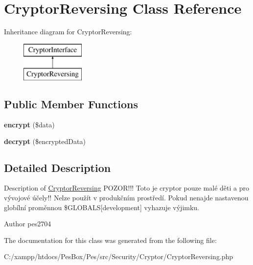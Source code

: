 \hypertarget{class_pes_1_1_security_1_1_cryptor_1_1_cryptor_reversing}{}\section{Cryptor\+Reversing Class Reference}
\label{class_pes_1_1_security_1_1_cryptor_1_1_cryptor_reversing}
Inheritance diagram for Cryptor\+Reversing\+:\begin{figure}[H]
\begin{center}
\leavevmode
\includegraphics[height=2.000000cm]{class_pes_1_1_security_1_1_cryptor_1_1_cryptor_reversing}
\end{center}
\end{figure}
\subsection*{Public Member Functions}
\begin{DoxyCompactItemize}
\item 
\mbox{\label{class_pes_1_1_security_1_1_cryptor_1_1_cryptor_reversing_a07bcc8ef1d23370470ecb5ae8fc07dfa}} 
{\bfseries encrypt} (\$data)
\item 
\mbox{\label{class_pes_1_1_security_1_1_cryptor_1_1_cryptor_reversing_ac5a3db4820ef04ce648cd623192c8d96}} 
{\bfseries decrypt} (\$encrypted\+Data)
\end{DoxyCompactItemize}


\subsection{Detailed Description}
Description of \mbox{\hyperlink{class_pes_1_1_security_1_1_cryptor_1_1_cryptor_reversing}{Cryptor\+Reversing}} P\+O\+Z\+O\+R!!! Toto je cryptor pouze malé děti a pro vývojové účely!! Nelze použít v produkčním prostředí. Pokud nenajde nastavenou globílní proměnnou \$\+G\+L\+O\+B\+A\+LS\mbox{[}\textquotesingle{}development\textquotesingle{}\mbox{]} vyhazuje výjimku.

\begin{DoxyAuthor}{Author}
pes2704 
\end{DoxyAuthor}


The documentation for this class was generated from the following file\+:\begin{DoxyCompactItemize}
\item 
C\+:/xampp/htdocs/\+Pes\+Box/\+Pes/src/\+Security/\+Cryptor/Cryptor\+Reversing.\+php\end{DoxyCompactItemize}
